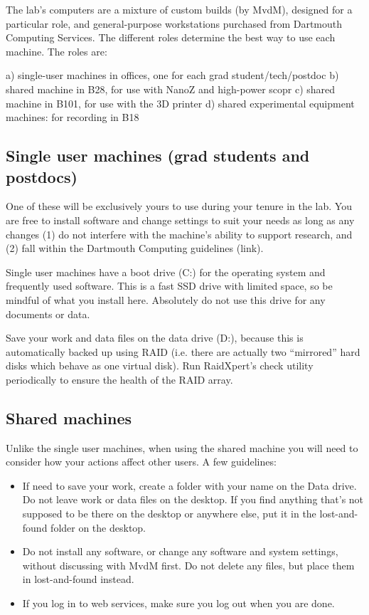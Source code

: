 \documentclass{tufte-book}
\begin{document}
The lab's computers are a mixture of custom builds (by MvdM), designed
for a particular role, and general-purpose workstations purchased from
Dartmouth Computing Services. The different roles determine the best
way to use each machine. The roles are:

a) single-user machines in offices, one for each grad student/tech/postdoc
b) shared machine in B28, for use with NanoZ and high-power scopr
c) shared machine in B101, for use with the 3D printer
d) shared experimental equipment machines: for recording in B18

\subsection{Single user machines (grad students and postdocs)}

One of these will be exclusively yours to use during your tenure in
the lab. You are free to install software and change settings to suit
your needs as long as any changes (1) do not interfere with the
machine's ability to support research, and (2) fall within the
Dartmouth Computing guidelines (link).

Single user machines have a boot drive (C:) for the operating system
and frequently used software. This is a fast SSD drive with limited
space, so be mindful of what you install here. Absolutely do not use
this drive for any documents or data.

Save your work and data files on the data drive (D:), because this is
automatically backed up using RAID (i.e. there are actually two
``mirrored'' hard disks which behave as one virtual disk). Run
RaidXpert's check utility periodically to ensure the health of the
RAID array.

\subsection{Shared machines}

Unlike the single user machines, when using the shared machine you
will need to consider how your actions affect other users. A few
guidelines:

\begin{itemize}
\item{If need to save your work, create a folder with your name on the Data
drive. Do not leave work or data files on the desktop. If you find
anything that's not supposed to be there on the desktop or anywhere
else, put it in the lost-and-found folder on the desktop.}
\item{Do not install any software, or change any software and system
settings, without discussing with MvdM first. Do not delete any files,
but place them in lost-and-found instead.}
\item{If you log in to web services, make sure you log out when you are
done.}
\end{itemize}
\end{document}
